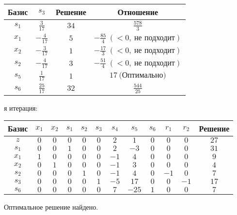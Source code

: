 \documentclass{article}%
\begin{document}
\begin{flushleft}
\begin{tabular}{|c|cccccccccc|c|}
\hline%
\end{tabular}%
\newline%
\newline%
\newline%
\begin{tabular}{|cccc|}%
\hline%
Базис&$s_{3}$&Решение&Отношение\\%
\hline%
$s_{1}$&$\frac{3}{17}$&$34$&$\frac{578}{3}$\\%
$x_{1}$&$-\frac{4}{17}$&$5$&$-\frac{85}{4}\: (< 0, \: \text{не подходит})$\\%
$x_{2}$&$-\frac{3}{17}$&$1$&$-\frac{17}{3}\: (< 0, \: \text{не подходит})$\\%
$s_{2}$&$-\frac{4}{17}$&$3$&$-\frac{51}{4}\: (< 0, \: \text{не подходит})$\\%
$s_{5}$&$\frac{1}{17}$&$1$&$17\: \text{(Оптимально)}$\\%
$s_{6}$&$\frac{25}{17}$&$32$&$\frac{544}{25}$\\%
\hline%
\end{tabular}%
\newline%
\newline%
я итерация: %
\newline%
\newline%
\renewcommand{\arraystretch}{1.3}%
\begin{tabular}{|c|cccccccccc|c|}%
\hline%
Базис&$x_{1}$&$x_{2}$&$s_{1}$&$s_{2}$&$s_{3}$&$s_{4}$&$s_{5}$&$s_{6}$&$r_{1}$&$r_{2}$&Решение\\%
\hline%
$z$&$0$&$0$&$0$&$0$&$0$&$2$&$1$&$0$&$0$&$0$&$27$\\%
\hline%
$s_{1}$&$0$&$0$&$1$&$0$&$0$&$2$&$-3$&$0$&$0$&$0$&$31$\\%
$x_{1}$&$1$&$0$&$0$&$0$&$0$&$-1$&$4$&$0$&$0$&$0$&$9$\\%
$x_{2}$&$0$&$1$&$0$&$0$&$0$&$-1$&$3$&$0$&$0$&$0$&$4$\\%
$s_{2}$&$0$&$0$&$0$&$1$&$0$&$-1$&$4$&$0$&$-1$&$0$&$7$\\%
$s_{3}$&$0$&$0$&$0$&$0$&$1$&$-5$&$17$&$0$&$0$&$-1$&$17$\\%
$s_{6}$&$0$&$0$&$0$&$0$&$0$&$7$&$-25$&$1$&$0$&$0$&$7$\\%
\hline%
\end{tabular}%
\newline%
\end{flushleft}%
Оптимальное решение найдено.%
\newline%
\end{document}
